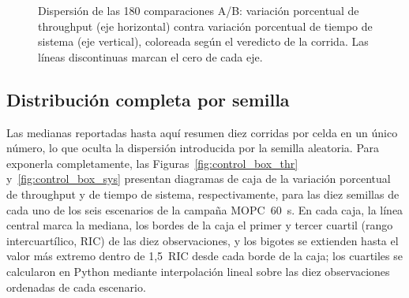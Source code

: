 \begin{figure}[htbp]
\centering
{}
\caption{Dispersión de las 180 comparaciones A/B: variación porcentual de throughput (eje
horizontal) contra variación porcentual de tiempo de sistema (eje vertical), coloreada
según el veredicto de la corrida. Las líneas discontinuas marcan el cero de cada eje.}
\label{fig:control_scatter}
\end{figure}

\subsection{Distribución completa por semilla}
\label{subsec:control_distribucion}

Las medianas reportadas hasta aquí resumen diez corridas por celda en un único número, lo
que oculta la dispersión introducida por la semilla aleatoria. Para exponerla
completamente, las Figuras~\ref{fig:control_box_thr} y~\ref{fig:control_box_sys}
presentan diagramas de caja de la variación porcentual de throughput y de tiempo de
sistema, respectivamente, para las diez semillas de cada uno de los seis escenarios de la
campaña MOPC~60~s. En cada caja, la línea central marca la mediana, los bordes de la
caja el primer y tercer cuartil (rango intercuartílico, RIC) de las diez observaciones, y
los bigotes se extienden hasta el valor más extremo dentro de 1,5~RIC desde cada borde de
la caja; los cuartiles se calcularon en Python mediante interpolación lineal sobre las
diez observaciones ordenadas de cada escenario.


